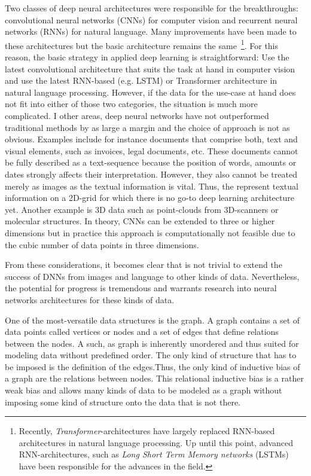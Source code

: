 Two classes of deep neural architectures were responsible for the breakthroughs: convolutional neural networks (CNNs) for computer vision and recurrent neural networks (RNNs) for natural language. Many improvements have been made to these architectures but the basic architecture remains the same~\footnote{Recently, \textit{Transformer}-architectures have largely replaced RNN-based architectures in natural language processing. Up until this point, advanced RNN-architectures, such as \textit{Long Short Term Memory networks} (LSTMs) have been responsible for the advances in the field.}. For this reason, the basic strategy in applied deep learning is straightforward: Use the latest convolutional architecture that suits the task at hand in computer vision and use the latest RNN-based (e.g. LSTM) or Transformer architecture in natural language processing. However, if the data for the use-case at hand does not fit into either of those two categories, the situation is much more complicated. I other areas, deep neural networks have not outperformed traditional methods by as large a margin and the choice of approach is not as obvious. Examples include for instance documents that comprise both, text and visual elements, such as invoices, legal documents, etc. These documents cannot be fully described as a text-sequence because the position of words, amounts or dates strongly affects their interpretation. However, they also cannot be treated merely as images as the textual information is vital. Thus, the represent textual information on a 2D-grid for which there is no go-to deep learning architecture yet. Another example is 3D data such as point-clouds from 3D-scanners or molecular structures. In theory, CNNs can be extended to three or higher dimensions but in practice this approach is computationally not feasible due to the cubic number of data points in three dimensions.

From these considerations, it becomes clear that is not trivial to extend the success of DNNs from images and language to other kinds of data. Nevertheless, the potential for progress is tremendous and warrants research into neural networks architectures for these kinds of data.

One of the most-versatile data structures is the graph. A graph contains a set of data points called vertices or nodes and a set of edges that define relations between the nodes. A such, as graph is inherently unordered and thus suited for modeling data without predefined order. The only kind of structure that has to be imposed is the definition of the edges.Thus, the only kind of inductive bias of a graph are the relations between nodes. This relational inductive bias is a rather weak bias and allows many kinds of data to be modeled as a graph without imposing some kind of structure onto the data that is not there.

